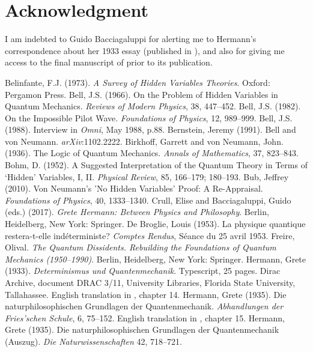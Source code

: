 \documentclass[12pt]{article}
\begin{document}
\section*{Acknowledgment}
I am indebted to Guido Bacciagaluppi for alerting me to Hermann's correspondence about her 1933 essay (published in \cite{kay}), and also for giving me access to the final manuscript of \cite{crull} prior to its publication.





\begin{thebibliography}{99}
Belinfante, F.J. (1973). \emph{A Survey of Hidden Variables Theories}. Oxford: Pergamon Press.
Bell, J.S. (1966). On the Problem of Hidden Variables in Quantum Mechanics. \emph{Reviews of Modern Physics}, 38, 447--452.
Bell, J.S. (1982). On the Impossible Pilot Wave. \emph{Foundations of Physics}, 12, 989--999.
Bell, J.S. (1988). Interview in \emph{Omni}, May 1988, p.\@ 88.
Bernstein, Jeremy (1991). Bell and von Neumann. \emph{arXiv}:1102.2222.
Birkhoff, Garrett and von Neumann, John. (1936). The Logic of Quantum Mechanics. \emph{Annals of Mathematics}, 37, 823--843.
Bohm, D. (1952). A Suggested Interpretation of the Quantum Theory in Terms of `Hidden' Variables, I, II. \emph{Physical Review}, 85, 166--179; 180--193.
Bub, Jeffrey (2010). Von Neumann's 'No Hidden Variables' Proof: A Re-Appraisal. \emph{Foundations of Physics}, 40, 1333--1340.
Crull, Elise and Bacciagaluppi, Guido (eds.) (2017). \emph{Grete Hermann: Between Physics and Philosophy}. Berlin, Heidelberg, New York: Springer.
De Broglie, Louis (1953). La physique quantique restera-t-elle ind\'{e}terministe? \emph{Comptes Rendus}, S\'{e}ance du 25 avril 1953.
Freire, Olival. \emph{The Quantum Dissidents. Rebuilding the Foundations of Quantum Mechanics (1950--1990)}. Berlin, Heidelberg, New York: Springer.
Hermann, Grete (1933). \emph{Determinismus und Quantenmechanik}. Typescript, 25 pages. Dirac Archive, document DRAC 3/11, University Libraries, Florida State University, Tallahassee. English translation in \cite{crull}, chapter 14.
Hermann, Grete (1935). Die naturphilosophischen Grundlagen der Quantenmechanik. \emph{Abhandlungen der Fries'schen Schule}, 6, 75--152.
English translation in \cite{crull}, chapter 15.
Hermann, Grete  (1935). Die naturphilosophischen Grundlagen der Quantenmechanik (Auszug). \emph{Die Naturwissenschaften} 42, 718--721.

\end{thebibliography}
\end{document}
